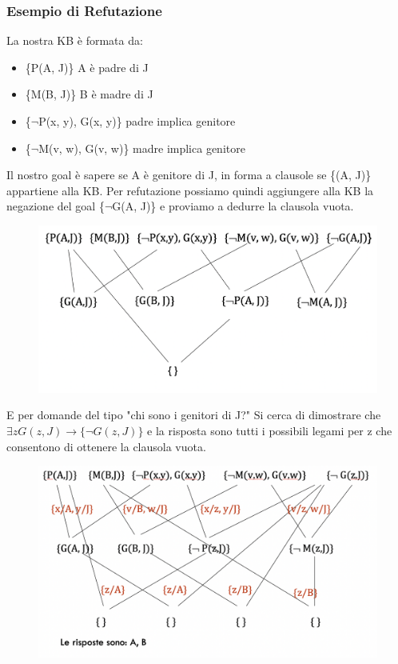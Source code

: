\documentclass{article}
\begin{document}
\subsubsection{Esempio di Refutazione}
La nostra KB è formata da:
\begin{itemize}
    \item \{P(A, J)\} A è padre di J
    \item \{M(B, J)\} B è madre di J
    \item \{$\neg$P(x, y), G(x, y)\} padre implica genitore
    \item \{$\neg$M(v, w), G(v, w)\} madre implica genitore
\end{itemize} \clearpage
Il nostro goal è sapere se A è genitore di J, in forma a clausole se \{(A, J)\} appartiene alla KB. Per refutazione possiamo quindi aggiungere alla KB la negazione del goal \{$\neg$G(A, J)\} e proviamo a dedurre la clausola vuota.
\begin{figure}[H]
\centering
\includegraphics[scale=0.4]{Images/refutazioneesempio.png}
\end{figure}
E per domande del tipo "chi sono i genitori di J?" \newline
Si cerca di dimostrare che $\exists z G(z,J) \rightarrow \{\neg G(z,J)\}$ e la risposta sono tutti i possibili legami per z che consentono di ottenere la clausola vuota.
\begin{figure}[H]
\centering
\includegraphics[scale=0.4]{Images/refutazioneesempio2.png}
\end{figure}
\end{document}
